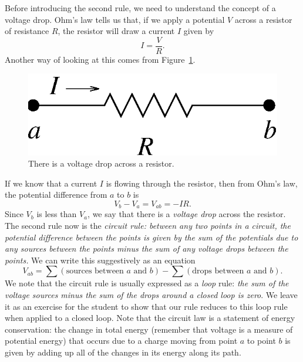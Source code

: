 Before introducing the second rule, we need to understand the concept of a
voltage drop. Ohm's law tells us that, if we apply a potential $V$ across a
resistor of resistance $R$, the resistor will draw a current $I$ given by
$$
I=\frac{V}{R}.     
$$ 
Another way of looking at this comes from Figure~\ref{fig:DC:ohm}.
\begin{figure}[htb]
\centering \epsfxsize=4cm \includegraphics[scale=0.6]{2_dc/ohm.eps}
\caption{There is a voltage drop across a resistor.}
\label{fig:DC:ohm}
\end{figure}
If we know that a current $I$ is flowing through the resistor, then from Ohm's 
law, the potential difference from $a$ to $b$ is 
$$
V_b-V_a  = V_{ab} = -IR.
$$
Since $V_b$ is less than $V_a$, we say that there is a {\it voltage drop}
across the resistor.  The second rule now is the 
{\it circuit rule: between any two points in a circuit, the potential 
difference between the points is given by the sum of the potentials due to 
any sources between the points minus the sum of any voltage drops between the 
points.}  We can write this suggestively as an equation 
\begin{equation}
V_{ab} = \sum (\mbox{sources between $a$ and $b$}) 
- \sum (\mbox{drops between $a$ and $b$}). \label{eq:DC:circuitrule}
\end{equation}
We note that the circuit rule is usually expressed as a {\it loop} rule: 
{\it the sum of the voltage sources minus the sum of the drops around a closed 
loop is zero}.  We leave it as an exercise for the student to show that our 
rule reduces to this loop rule when applied to a closed loop. Note that the 
circuit law is a statement of energy conservation: the change in total energy 
(remember that voltage is a measure of potential energy) that occurs due to a 
charge moving from point $a$ to point $b$ is given by adding up all of the 
changes in its energy along its path.

